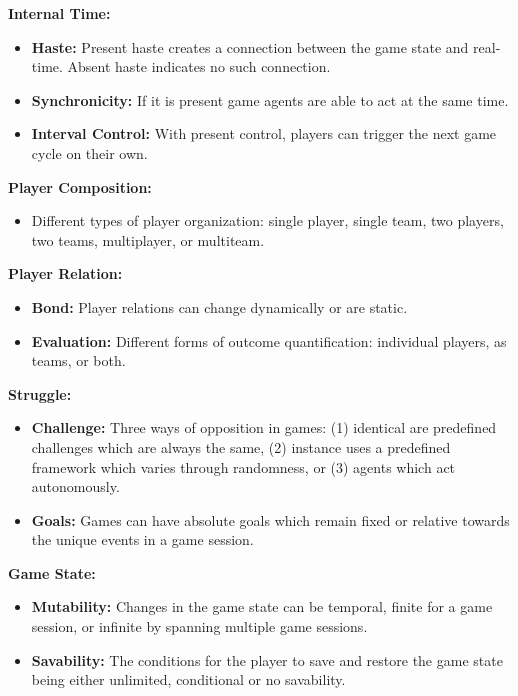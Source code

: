 \textbf{Internal Time:}
\begin{itemize}
    \item \textbf{Haste:} Present haste creates a connection between the game state and real-time. Absent haste indicates no such connection.
    \item \textbf{Synchronicity:} If it is present game agents are able to act at the same time.
    \item \textbf{Interval Control:} With present control, players can trigger the next game cycle on their own.
\end{itemize}

\textbf{Player Composition:}
\begin{itemize}
    \item Different types of player organization: single player, single team, two players, two teams, multiplayer, or multiteam.
\end{itemize}

\textbf{Player Relation:}
\begin{itemize}
    \item \textbf{Bond:} Player relations can change dynamically or are static.
    \item \textbf{Evaluation:} Different forms of outcome quantification: individual players, as teams, or both.
\end{itemize}

\textbf{Struggle:}
\begin{itemize}
    \item \textbf{Challenge:} Three ways of opposition in games: (1) identical are predefined challenges which are always the same, (2) instance uses a predefined framework which varies through randomness, or (3) agents which act autonomously.
    \item \textbf{Goals:} Games can have absolute goals which remain fixed or relative towards the unique events in a game session.
\end{itemize}

\textbf{Game State:}
\begin{itemize}
    \item \textbf{Mutability:} Changes in the game state can be temporal, finite for a game session, or infinite by spanning multiple game sessions.
    \item \textbf{Savability:} The conditions for the player to save and restore the game state being either unlimited, conditional or no savability.
\end{itemize}

